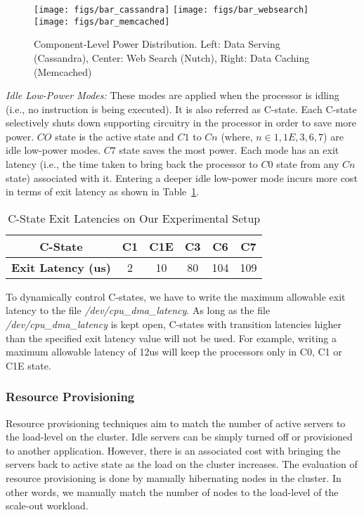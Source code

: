 \documentclass{sig-alternate}
\begin{document}
\begin{figure*}[t]
\centering
\texttt{[image: figs/bar\_cassandra]}
\texttt{[image: figs/bar\_websearch]}
\texttt{[image: figs/bar\_memcached]}
\caption{Component-Level Power Distribution. Left: Data Serving (Cassandra), Center: 
Web Search (Nutch), Right: Data Caching (Memcached)}
\label{fig:pdis}
\end{figure*}

\emph{Idle Low-Power Modes:} These modes are applied when the processor is idling 
(i.e., no instruction is being executed). It is also referred as C-state. Each C-state 
selectively shuts down supporting circuitry in the processor in order to save more 
power. $CO$ state is the active state and $C1$ to $Cn$ (where, $n\in{1, 1E, 3, 6, 7}$) 
are idle low-power modes. $C7$ state saves the most power. Each mode has an exit latency 
(i.e., the time taken to bring back the processor to $C0$ state from any $Cn$ state) 
associated with it. Entering a deeper idle low-power mode incurs more cost in 
terms of exit latency as shown in Table~\ref{tab:cstatelat}.

\begin{table}[htb]
\centering
\caption{C-State Exit Latencies on Our Experimental Setup}
\label{tab:cstatelat}
\begin{tabular}{|c|c|c|c|c|c|} 
\hline
\textbf{C-State} & C1 & C1E & C3 & C6 & C7 \\ \hline
\textbf{Exit Latency (us)} &	2 & 10 & 80 & 104 & 109 \\ \hline
\end{tabular}
\end{table}  

To dynamically control C-states, we have to write the maximum allowable exit latency to the 
file \emph{/dev/cpu\_dma\_latency}. As long as the file \emph{/dev/cpu\_dma\_latency} is kept open, 
C-states with transition latencies higher than the specified exit latency value will not be used. 
For example, writing a maximum allowable latency of 12us will keep the processors only in C0, C1 or C1E 
state.  


\subsubsection{Resource Provisioning}

Resource provisioning techniques aim to match the number of active servers 
to the load-level on the cluster. Idle servers can be simply turned off or 
provisioned to another application. However, there is an associated cost 
with bringing the servers back to active state as the load on the cluster increases. 
The evaluation of resource provisioning is done by manually hibernating nodes
in the cluster. In other words, we manually match the number of nodes to the load-level of the 
scale-out workload. 
\end{document}
